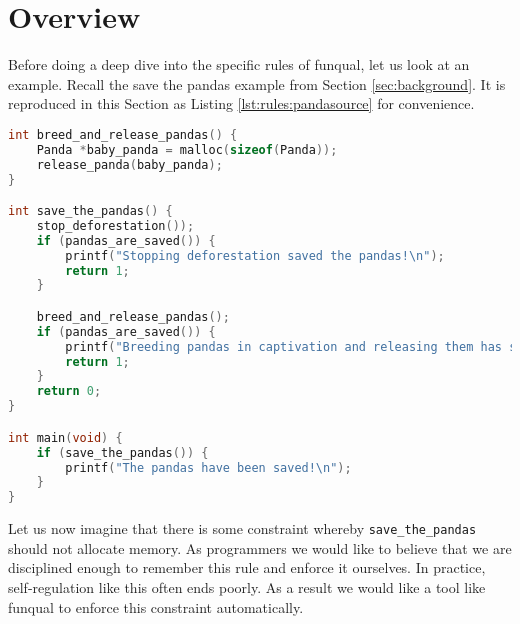 \section{Overview}\label{sec:rules:overview}

Before doing a deep dive into the specific rules of funqual, let us look at an example.  Recall the save the pandas example from Section \ref{sec:background}.  It is reproduced in this Section as Listing \ref{lst:rules:pandasource} for convenience.  

\noindent\begin{minipage}[t]{\linewidth}
\begin{lstlisting}[language=C,caption={Example C program.  Running this code in a production environment may not actually save the pandas},label={lst:rules:pandasource}]
int breed_and_release_pandas() {
    Panda *baby_panda = malloc(sizeof(Panda));
    release_panda(baby_panda);
}

int save_the_pandas() {
	stop_deforestation());
	if (pandas_are_saved()) {
		printf("Stopping deforestation saved the pandas!\n");
		return 1;
	}

	breed_and_release_pandas();
	if (pandas_are_saved()) {
		printf("Breeding pandas in captivation and releasing them has saved the pandas!\n");
		return 1;
	}
	return 0;
}

int main(void) {
	if (save_the_pandas()) {
		printf("The pandas have been saved!\n");
	}
}
\end{lstlisting}
\end{minipage}

Let us now imagine that there is some constraint whereby \lstinline{save_the_pandas} should not allocate memory. As programmers we would like to believe that we are disciplined enough to remember this rule and enforce it ourselves. In practice, self-regulation like this often ends poorly. As a result we would like a tool like funqual to enforce this constraint automatically.

